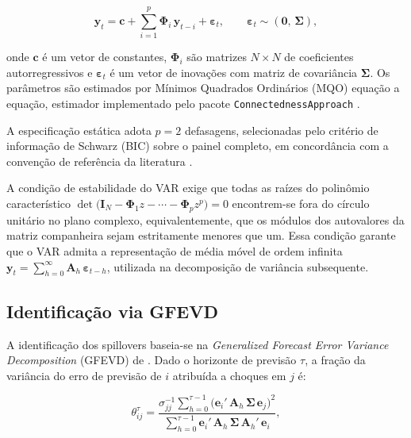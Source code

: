 \documentclass[12pt, a4paper, oneside, english, brazil]{abntex2}
\begin{document}
\begin{equation}
  \mathbf{y}_t
    = \mathbf{c}
    + \sum_{i=1}^{p} \boldsymbol{\Phi}_i\,\mathbf{y}_{t-i}
    + \boldsymbol{\varepsilon}_t,
  \qquad
  \boldsymbol{\varepsilon}_t \sim (\mathbf{0},\,\boldsymbol{\Sigma}),
  \label{eq:var}
\end{equation}

\noindent onde $\mathbf{c}$ é um vetor de constantes, $\boldsymbol{\Phi}_i$ são matrizes
$N \times N$ de coeficientes autorregressivos e $\boldsymbol{\varepsilon}_t$ é um vetor
de inovações com matriz de covariância $\boldsymbol{\Sigma}$. Os parâmetros são estimados
por Mínimos Quadrados Ordinários (MQO) equação a equação, estimador implementado pelo pacote
\texttt{ConnectednessApproach} \parencite{gabauer2022}.

A especificação estática adota $p = 2$ defasagens, selecionadas pelo
critério de informação de Schwarz (BIC) sobre o painel completo, em
concordância com a convenção de referência da literatura
\parencite{diebold2009, diebold2012}. 

A condição de estabilidade do VAR exige que todas as raízes do polinômio característico
$\det\!\bigl(\mathbf{I}_N - \boldsymbol{\Phi}_1 z - \cdots - \boldsymbol{\Phi}_p
z^p\bigr) = 0$ encontrem-se fora do círculo unitário no plano complexo,
equivalentemente, que os módulos dos autovalores da matriz companheira sejam estritamente
menores que um. Essa condição garante que o VAR admita a representação de média móvel de
ordem infinita $\mathbf{y}_t = \sum_{h=0}^{\infty} \mathbf{A}_h\,\boldsymbol{\varepsilon}_{t-h}$,
utilizada na decomposição de variância subsequente.

\subsection*{Identificação via GFEVD}

A identificação dos spillovers baseia-se na \textit{Generalized Forecast Error Variance
Decomposition} (GFEVD) de \textcite{pesaran1998}. Dado o horizonte de previsão $\tau$, a
fração da variância do erro de previsão de $i$ atribuída a choques em $j$ é:

\begin{equation}
  \theta^{\tau}_{ij}
    = \frac{
        \sigma_{jj}^{-1}
        \displaystyle\sum_{h=0}^{\tau-1}
        \bigl(\mathbf{e}_i'\,\mathbf{A}_h\,\boldsymbol{\Sigma}\,\mathbf{e}_j\bigr)^{2}
      }{
        \displaystyle\sum_{h=0}^{\tau-1}
        \mathbf{e}_i'\,\mathbf{A}_h\,\boldsymbol{\Sigma}\,\mathbf{A}_h'\,\mathbf{e}_i
      },
  \label{eq:gfevd}
\end{equation}
\end{document}
